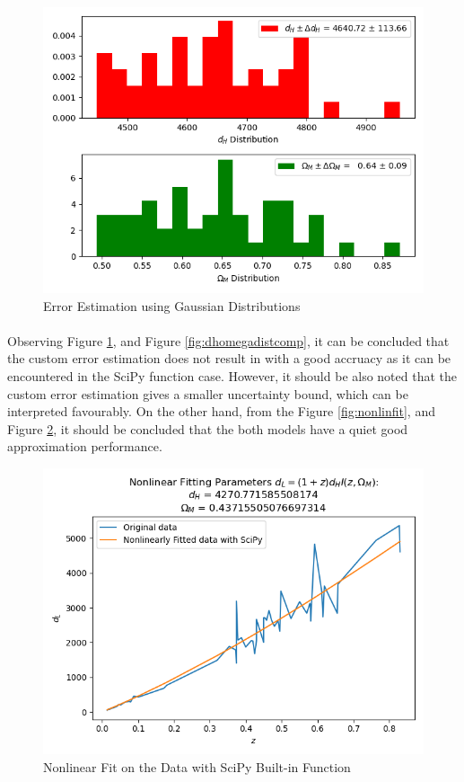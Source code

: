 \documentclass[letterpaper,12pt]{article}
\begin{document}
\begin{figure}[H]
    \centerline{\includegraphics[width=\linewidth]{figures/dhomegadist.png}}
    \caption{Error Estimation using Gaussian Distributions}
    \label{fig:dhomegadist}
    \end{figure}
\paragraph{} Observing Figure \ref{fig:dhomegadist}, and Figure \ref{fig:dhomegadistcomp}, it can be concluded that the custom error estimation does not result in with a good accruacy as it can be encountered in the SciPy function case. However, it should be also noted that the custom error estimation gives a smaller uncertainty bound, which can be interpreted favourably. On the other hand, from the Figure \ref{fig:nonlinfit}, and Figure \ref{fig:nonlinfitscipy}, it should be concluded that the both models have a quiet good approximation performance.
\begin{figure}[H]
    \centerline{\includegraphics[width=0.8\linewidth]{figures/nonlinfitscipy.png}}
    \caption{Nonlinear Fit on the Data with SciPy Built-in Function}
    \label{fig:nonlinfitscipy}
    \end{figure}
\end{document}
